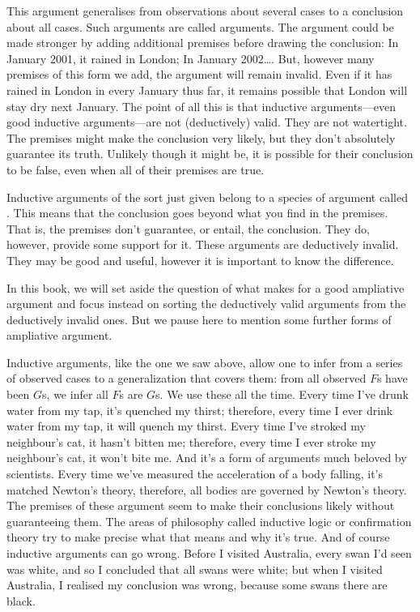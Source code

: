 This argument generalises from observations about several cases to a conclusion about all cases. Such arguments are called  arguments. 
The argument could be made stronger by adding additional premises before drawing the conclusion: In January 2001, it rained in London; In January 2002\ldots. But, however many premises of this form we add, the argument will remain invalid. Even if it has rained in London in every January thus far, it remains possible that London will stay dry next January. The point of all this is that inductive arguments—even good inductive arguments—are not (deductively) valid. They are not watertight. The premises might make the conclusion very likely, but they don't absolutely guarantee its truth. Unlikely though it might be, it is possible for their conclusion to be false, even when all of their premises are true.

Inductive arguments of the sort just given belong to a species of argument called . This means that the conclusion goes beyond what you find in the premises. That is, the premises don't guarantee, or entail, the conclusion. They do, however, provide some support for it. These arguments are deductively invalid. They may be good and useful, however it is important to know the difference.

In this book, we will set aside the question of what makes for a good ampliative argument and focus instead on sorting the deductively valid arguments from the deductively invalid ones.
But we pause here to mention some further forms of ampliative argument.

Inductive arguments, like the one we saw above, allow one to infer from a series of observed cases to a generalization that covers them: from all observed $F$s have been $G$s, we infer all $F$s are $G$s. We use these all the time. Every time I've drunk water from my tap, it's quenched my thirst; therefore, every time I ever drink water from my tap, it will quench my thirst. Every time I've stroked my neighbour's cat, it hasn't bitten me; therefore, every time I ever stroke my neighbour's cat, it won't bite me. And it's a form of arguments much beloved by scientists. Every time we've measured the acceleration of a body falling, it's matched Newton's theory, therefore, all bodies are governed by Newton's theory. The premises of these argument seem to make their conclusions likely without guaranteeing them. The areas of philosophy called inductive logic or confirmation theory try to make precise what that means and why it's true. And of course inductive arguments can go wrong. Before I visited Australia, every swan I'd seen was white, and so I concluded that all swans were white; but when I visited Australia, I realised my conclusion was wrong, because some swans there are black.

